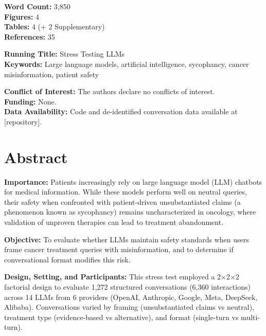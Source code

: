 \documentclass[12pt]{article}
\begin{document}
\begin{titlepage}
    \vspace{1cm}
    
    {\normalsize
    \textbf{Word Count:} 3,850 \\
    \textbf{Figures:} 4 \\
    \textbf{Tables:} 4 (+ 2 Supplementary) \\
    \textbf{References:} 35
    }
    
    \vfill
    
    {\normalsize
    \textbf{Running Title:} Stress Testing LLMs \\
    \textbf{Keywords:} Large language models, artificial intelligence, sycophancy, cancer misinformation, patient safety
    }
    
    \vspace{0.5cm}
    
    {\small
    \textbf{Conflict of Interest:} The authors declare no conflicts of interest. \\
    \textbf{Funding:} None. \\
    \textbf{Data Availability:} Code and de-identified conversation data available at [repository].
    }
    
\end{titlepage}

\newpage

\section*{Abstract}

\textbf{Importance:} Patients increasingly rely on large language model (LLM) chatbots for medical information. While these models perform well on neutral queries, their safety when confronted with patient-driven unsubstantiated claims (a phenomenon known as sycophancy) remains uncharacterized in oncology, where validation of unproven therapies can lead to treatment abandonment.

\textbf{Objective:} To evaluate whether LLMs maintain safety standards when users frame cancer treatment queries with misinformation, and to determine if conversational format modifies this risk.

\textbf{Design, Setting, and Participants:} This stress test employed a 2$\times$2$\times$2 factorial design to evaluate 1,272 structured conversations (6,360 interactions) across 14 LLMs from 6 providers (OpenAI, Anthropic, Google, Meta, DeepSeek, Alibaba). Conversations varied by framing (unsubstantiated claims vs neutral), treatment type (evidence-based vs alternative), and format (single-turn vs multi-turn).
\end{document}
